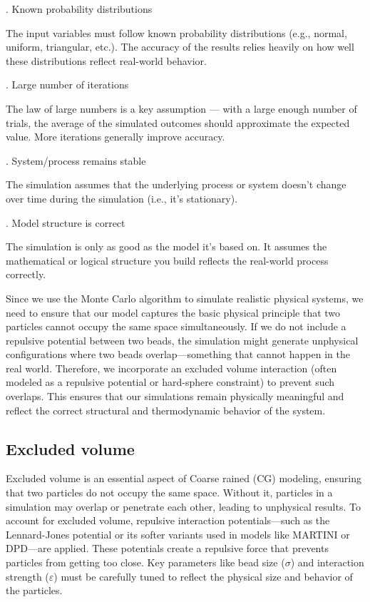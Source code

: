\documentclass[12pt]{article}
\begin{document}
\begin{flushleft}
. Known probability distributions
    
The input variables must follow known probability distributions (e.g., normal, uniform, triangular, etc.). The accuracy of the results relies heavily on how well these distributions reflect real-world behavior.

. Large number of iterations
    
The law of large numbers is a key assumption — with a large enough number of trials, the average of the simulated outcomes should approximate the expected value. More iterations generally improve accuracy.

. System/process remains stable
    
The simulation assumes that the underlying process or system doesn’t change over time during the simulation (i.e., it's stationary).

. Model structure is correct

The simulation is only as good as the model it's based on. It assumes the mathematical or logical structure you build reflects the real-world process correctly.




Since we use the Monte Carlo algorithm to simulate realistic physical systems, we need to ensure that our model captures the basic physical principle that two particles cannot occupy the same space simultaneously. If we do not include a repulsive potential between two beads, the simulation might generate unphysical configurations where two beads overlap—something that cannot happen in the real world. Therefore, we incorporate an excluded volume interaction (often modeled as a repulsive potential or hard-sphere constraint) to prevent such overlaps. This ensures that our simulations remain physically meaningful and reflect the correct structural and thermodynamic behavior of the system.

\subsection*{Excluded volume}

Excluded volume is an essential aspect of Coarse rained (CG) modeling, ensuring that two particles do not occupy the same space. Without it, particles in a simulation may overlap or penetrate each other, leading to unphysical results. To account for excluded volume, repulsive interaction potentials—such as the Lennard-Jones potential or its softer variants used in models like MARTINI or DPD—are applied. These potentials create a repulsive force that prevents particles from getting too close. Key parameters like bead size ($\sigma$) and interaction strength ($\varepsilon$) must be carefully tuned to reflect the physical size and behavior of the particles.


\end{flushleft}
\end{document}
